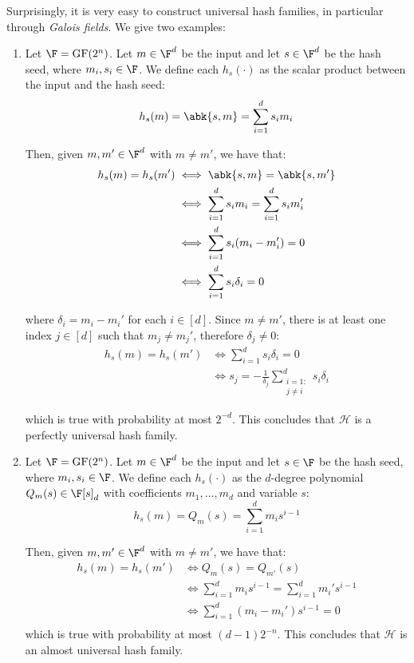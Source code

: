 \documentclass[a4paper, 12pt]{report}
\begin{document}
    Surprisingly, it is very easy to construct universal hash families, in particular through \textit{Galois fields}. We give two examples:
    \begin{enumerate}
        \item Let $\F = \mathrm{GF}(2^n)$. Let $m \in \F^d$ be the input and let $s \in \F^d$ be the hash seed, where $m_i, s_i \in \F$. We define each $h_s(\cdot)$ as the scalar product between the input and the hash seed:
        \[h_s(m) = \abk{s, m} = \sum_{i = 1}^d s_i m_i\]

        Then, given $m, m' \in \F^d$ with $m \neq m'$, we have that:
        \[\begin{split}
            h_s(m) = h_s(m') &\iff \abk{s, m} = \abk{s, m'} \\
            &\iff \sum_{i = 1}^d s_i m_i = \sum_{i = 1}^d s_i m_i' \\
            &\iff \sum_{i = 1}^d s_i (m_i-m_i') = 0 \\
            &\iff \sum_{i = 1}^d s_i \delta_i = 0 \\
        \end{split}\]

        where $\delta_i = m_i - m_i'$ for each $i \in [d]$. Since $m \neq m'$, there is at least one index $j \in [d]$ such that $m_j \neq m_j'$, therefore $\delta_j \neq 0$:
        \[\begin{split}
            h_s(m) = h_s(m') &\iff \sum_{i = 1}^d s_i \delta_i = 0 \\
            &\iff s_j = - \frac{1}{\delta_j} \sum_{\substack{i = 1 :\\ j \neq i}}^d s_i\delta_i
        \end{split}\]

        which is true with probability at most $2^{-d}$. This concludes that $\mathcal{H}$ is a perfectly universal hash family.

        \item Let $\F = \mathrm{GF}(2^n)$. Let $m \in \F^d$ be the input and let $s \in \F$ be the hash seed, where $m_i, s_i \in \F$. We define each $h_s(\cdot)$ as the $d$-degree polynomial $Q_m(s) \in \F[s]_{d}$ with coefficients $m_1, \ldots, m_d$ and variable $s$:
        \[h_s(m) = Q_m(s) = \sum_{i = 1}^d m_i s^{i-1}\]

        Then, given $m, m' \in \F^d$ with $m \neq m'$, we have that:
        \[\begin{split}
            h_s(m) = h_s(m') &\iff Q_m(s) = Q_{m'}(s)\\
            &\iff \sum_{i = 1}^d m_i s^{i-1} = \sum_{i = 1}^d m_i' s^{i-1}  \\
            &\iff \sum_{i = 1}^d (m_i-m_i') s^{i-1} = 0 \\
        \end{split}\]
        which is true with probability at most $(d-1)2^{-n}$. This concludes that $\mathcal{H}$ is an almost universal hash family.
    \end{enumerate}
\end{document}
